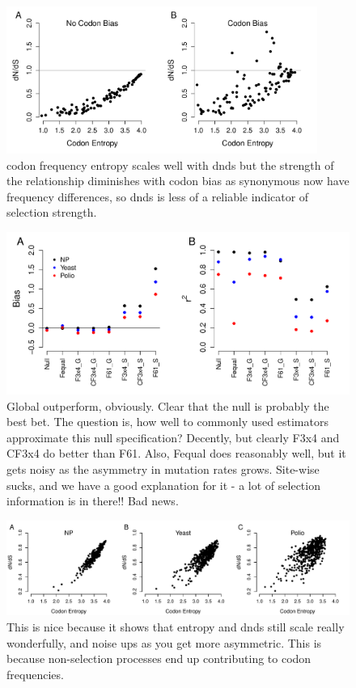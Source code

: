 \documentclass[11pt]{article}
\begin{document}
\bigskip
\begin{figure}[H]
\centerline{\includegraphics[width=4in]{figures/MainText/entropy_vs_dnds.pdf}}
\caption{\label{entropy_dnds} codon frequency entropy scales well with dnds but the strength of the relationship diminishes with codon bias as synonymous now have frequency differences, so dnds is less of a reliable indicator of selection strength.}
\end{figure}


\bigskip
\begin{figure}[H]
\centerline{\includegraphics[width=6in]{figures/MainText/nyp_bias_r2.pdf}}
\caption{\label{nyp_bias_r2} Global outperform, obviously. Clear that the null is probably the best bet. The question is, how well to commonly used estimators approximate this null specification? Decently, but clearly F3x4 and CF3x4 do better than F61. Also, Fequal does reasonably well, but it gets noisy as the asymmetry in mutation rates grows. Site-wise sucks, and we have a good explanation for it - a lot of selection information is in there!! Bad news.}
\end{figure}


\bigskip
\begin{figure}[H]
\centerline{\includegraphics[width=6in]{figures/MainText/nyp_entropy_vs_dnds.pdf}}
\caption{\label{nyp_entropy_dnds} This is nice because it shows that entropy and dnds still scale really wonderfully, and noise ups as you get more asymmetric. This is because non-selection processes end up contributing to codon frequencies.}
\end{figure}
\end{document}
